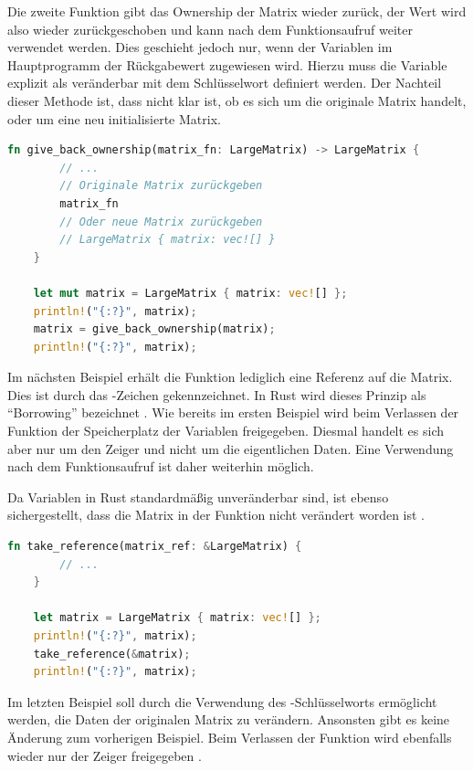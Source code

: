 \documentclass[11pt,a4paper, ngerman]{article}
\begin{document}
Die zweite Funktion gibt das Ownership der Matrix wieder zurück, der Wert wird also wieder zurückgeschoben und kann nach dem Funktionsaufruf weiter verwendet werden. Dies geschieht jedoch nur, wenn der Variablen im Hauptprogramm der Rückgabewert zugewiesen wird. Hierzu muss die Variable  explizit als veränderbar mit dem Schlüsselwort  definiert werden. Der Nachteil dieser Methode ist, dass nicht klar ist, ob es sich um die originale Matrix handelt, oder um eine neu initialisierte Matrix.

\newpage

\begin{lstlisting}[language=rust, caption={Einführendes Beispiel: Ownership zurückgeben}]
    fn give_back_ownership(matrix_fn: LargeMatrix) -> LargeMatrix {
        // ...
        // Originale Matrix zurückgeben
        matrix_fn
        // Oder neue Matrix zurückgeben
        // LargeMatrix { matrix: vec![] }
    }

    let mut matrix = LargeMatrix { matrix: vec![] };
    println!("{:?}", matrix);
    matrix = give_back_ownership(matrix);
    println!("{:?}", matrix);
\end{lstlisting}

Im nächsten Beispiel erhält die Funktion lediglich eine Referenz auf die Matrix. Dies ist durch das \codeword{&}-Zeichen gekennzeichnet. In Rust wird dieses Prinzip als ``Borrowing'' bezeichnet \cite{RustBorrowing}. Wie bereits im ersten Beispiel wird beim Verlassen der Funktion der Speicherplatz der Variablen freigegeben. Diesmal handelt es sich aber nur um den Zeiger und nicht um die eigentlichen Daten. Eine Verwendung nach dem Funktionsaufruf ist daher weiterhin möglich.

Da Variablen in Rust standardmäßig unveränderbar sind, ist ebenso sichergestellt, dass die Matrix in der Funktion nicht verändert worden ist \cite{RustVariablesAndMutability}. 

\begin{lstlisting}[language=rust, caption={Einführendes Beispiel: Unveränderliche Referenz}]
    fn take_reference(matrix_ref: &LargeMatrix) {
        // ...
    }

    let matrix = LargeMatrix { matrix: vec![] };
    println!("{:?}", matrix);
    take_reference(&matrix);
    println!("{:?}", matrix);
\end{lstlisting}

Im letzten Beispiel soll durch die Verwendung des -Schlüsselworts ermöglicht werden, die Daten der originalen Matrix zu verändern. Ansonsten gibt es keine Änderung zum vorherigen Beispiel. Beim Verlassen der Funktion wird ebenfalls wieder nur der Zeiger freigegeben \cite{RustOwnershipFreed}.
\end{document}
